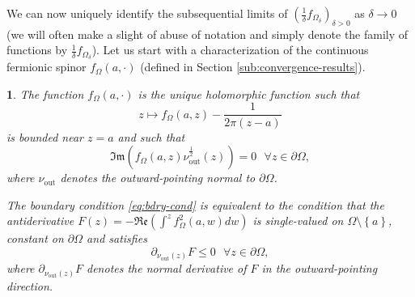 \documentclass[oneside,english]{amsart}
\numberwithin{equation}{section}
\numberwithin{figure}{section}
\theoremstyle{plain}
\theoremstyle{plain}
\theoremstyle{plain}
\theoremstyle{plain}
\theoremstyle{plain}
\newtheorem{lem}[thm]{\protect\lemmaname}
\theoremstyle{definition}
\theoremstyle{remark}
\providecommand{\lemmaname}{Lemma}
\begin{document}
We can now uniquely identify the subsequential limits of $\left(\frac{1}{\delta}f_{\Omega_{\delta}}\right)_{\delta>0}$
as $\delta\to0$ (we will often make a slight of abuse of notation
and simply denote the family of functions by $\frac{1}{\delta}f_{\Omega_{\delta}}$).
Let us start with a characterization of the continuous fermionic spinor
$f_{\Omega}\left(a,\cdot\right)$ (defined in Section \ref{sub:convergence-results}).
\begin{lem}
\label{lem:uniqueness-continuous-observable}The function $f_{\Omega}\left(a,\cdot\right)$
is the unique holomorphic function such that 
\[
z\mapsto f_{\Omega}\left(a,z\right)-\frac{1}{2\pi\left(z-a\right)}
\]
is bounded near $z=a$ and such that 
\begin{equation}
\Im\mathfrak{m}\left(f_{\Omega}\left(a,z\right)\nu_{\mathrm{out}}^{\frac{1}{2}}\left(z\right)\right)=0\,\,\,\,\forall z\in\partial\Omega,\label{eq:bdry-cond}
\end{equation}
where $\nu_{\mathrm{out}}$ denotes the outward-pointing normal to
$\partial\Omega$. 

The boundary condition \ref{eq:bdry-cond} is equivalent to the condition
that the antiderivative $F\left(z\right)=-\Re\mathfrak{e}\left(\int^{z}f_{\Omega}^{2}\left(a,w\right)dw\right)$
is single-valued on $\Omega\setminus\left\{ a\right\} $, constant
on $\partial\Omega$ and satisfies
\[
\partial_{\nu_{\mathrm{out}}\left(z\right)}F\leq0\,\,\,\,\forall z\in\partial\Omega,
\]
where $\partial_{\nu_{\mathrm{out}}\left(z\right)}F$ denotes the
normal derivative of $F$ in the outward-pointing direction.\end{lem}
\end{document}
